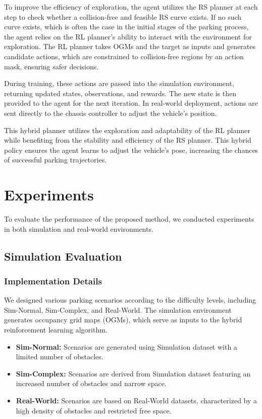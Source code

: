 \documentclass[ conference]{./support/ieeeconf}
\begin{document}
To improve the efficiency of exploration, the agent utilizes the RS planner at each step to check whether a collision-free and feasible RS curve exists. 
If no such curve exists, which is often the case in the initial stages of the parking process, the agent relies on the RL planner's ability to interact with the environment for exploration. The RL planner takes OGMs and the target as inputs and generates candidate actions, which are constrained to collision-free regions by an action mask, ensuring safer decisions. 

During training, these actions are passed into the simulation environment, returning updated states, observations, and rewards. The new state is then provided to the agent for the next iteration. 
In real-world deployment, actions are sent directly to the chassis controller to adjust the vehicle’s position.

This hybrid planner utilizes the exploration and adaptability of the RL planner while benefiting from the stability and efficiency of the RS planner.
This hybrid policy ensures the agent learns to adjust the vehicle's pose, increasing the chances of successful parking trajectories.


\section{Experiments}
To evaluate the performance of the proposed method, we conducted experiments in both simulation and real-world environments.
\subsection{Simulation Evaluation}


\subsubsection{Implementation Details}
We designed various parking scenarios according to the difficulty levels, including Sim-Normal, Sim-Complex, and Real-World.
The simulation environment generates occupancy grid maps (OGMs), which serve as inputs to the hybrid reinforcement learning algorithm. 

\begin{itemize}
    \item \textbf{Sim-Normal:} Scenarios are generated using Simulation dataset with a limited number of obstacles.
    \item \textbf{Sim-Complex:} Scenarios are derived from Simulation dataset featuring an increased number of obstacles and narrow space.
    \item \textbf{Real-World:} Scenarios are based on Real-World datasets, characterized by a high density of obstacles and restricted free space.
\end{itemize}
\end{document}
